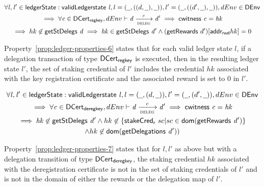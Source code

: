 \begin{property}
  \begin{multline*}
    \forall \var{l}, \var{l'} \in \ledgerState: \applyFun{validLedgerstate}{l},
    l = (\wcard, ((d, \wcard), \wcard)), l' = (\wcard, ((d',\wcard), \wcard)), dEnv\in\DEnv \\
    \implies \forall \var{c} \in \DCertRegKey, dEnv\vdash \var{d}
    \trans{deleg}{c} \var{d'} \implies \applyFun{cwitness}{c} = \var{hk}\\
    \implies hk\not\in \fun{getStDelegs}~\var{d} \implies \var{hk} \in
    \applyFun{getStDelegs}{d'} \wedge
    (\applyFun{getRewards}\var{d'})[\fun{addr_{rwd}}{hk}] = 0
  \end{multline*}
  \label{prop:ledger-properties-6}
\end{property}

Property~\ref{prop:ledger-properties-6} states that for each valid ledger state
$l$, if a delegation transaction of type $\mathsf{DCert_{regkey}}$ is executed, then in the
resulting ledger state $l'$, the set of staking credential of $l'$ includes the
credential $hk$ associated with the key registration certificate and the
associated reward is set to 0 in $l'$.

\begin{property}
  \begin{multline*}
    \forall \var{l}, \var{l'} \in \ledgerState: \applyFun{validLedgerstate}{l},
    l = (\wcard, (d, \wcard)), l' = (\wcard, (d', \wcard)), dEnv\in\DEnv \\
    \implies \forall \var{c} \in \DCertDeRegKey, dEnv\vdash\var{d}
    \trans{deleg}{c} \var{d'} \implies \applyFun{cwitness}{c} = \var{hk}\\
    \implies \var{hk} \not\in \applyFun{getStDelegs}{d'} \wedge hk\not\in
    \left\{ \fun{stakeCred_{r}}~sc\vert
      sc\in\fun{dom}(\applyFun{getRewards}{d'})
    \right\}\\
    \wedge hk \not\in \fun{dom}(\applyFun{getDelegations}{d'}))
  \end{multline*}
  \label{prop:ledger-properties-7}
\end{property}

Property~\ref{prop:ledger-properties-7} states that for $l, l'$ as above but
with a delegation transition of type $\mathsf{DCert_{deregkey}}$, the staking credential
$hk$ associated with the deregistration certificate is not in the set of staking
credentials of $l'$ and is not in the domain of either the rewards or the
delegation map of $l'$.

